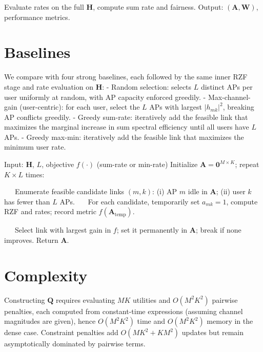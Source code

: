 {\begin{algorithm}[htbp]
\begin{algorithmic}[1]
\State Evaluate rates on the full $\mathbf{H}$, compute sum rate and fairness.
\State Output: $(\mathbf{A},\mathbf{W})$, performance metrics.
\end{algorithmic}
\end{algorithm}

\section{Baselines}
We compare with four strong baselines, each followed by the same inner RZF stage and rate evaluation on $\mathbf{H}$:
- Random selection: selects $L$ distinct APs per user uniformly at random, with AP capacity enforced greedily.
- Max-channel-gain (user-centric): for each user, select the $L$ APs with largest $|h_{mk}|^2$, breaking AP conflicts greedily.
- Greedy sum-rate: iteratively add the feasible link that maximizes the marginal increase in sum spectral efficiency until all users have $L$ APs.
- Greedy max-min: iteratively add the feasible link that maximizes the minimum user rate.

\begin{algorithm}[htbp]
\caption{Greedy Sum-Rate and Greedy Max-Min (Selection Only)}
\begin{algorithmic}[1]
\State Input: $\mathbf{H}$, $L$, objective $f(\cdot)$ (sum-rate or min-rate)
\State Initialize $\mathbf{A}=\mathbf{0}^{M\times K}$; repeat $K\!\times\!L$ times:

\State ~~~Enumerate feasible candidate links $(m,k)$: (i) AP $m$ idle in $\mathbf{A}$; (ii) user $k$ has fewer than $L$ APs.
\State ~~~For each candidate, temporarily set $a_{mk}\!=\!1$, compute RZF and rates; record metric $f(\mathbf{A}_{\text{temp}})$.

\State ~~~Select link with largest gain in $f$; set it permanently in $\mathbf{A}$; break if none improves.
\State Return $\mathbf{A}$.
\end{algorithmic}
\end{algorithm}

\section{Complexity}
Constructing $\mathbf{Q}$ requires evaluating $MK$ utilities and $O(M^2K^2)$ pairwise penalties, each computed from constant-time expressions (assuming channel magnitudes are given), hence $O(M^2K^2)$ time and $O(M^2K^2)$ memory in the dense case. Constraint penalties add $O(MK^2+KM^2)$ updates but remain asymptotically dominated by pairwise terms.

}
